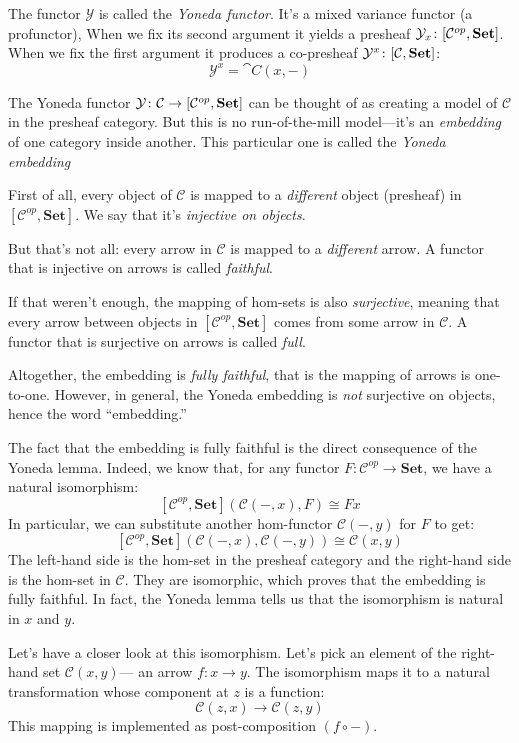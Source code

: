 \documentclass[DaoFP]{subfiles}
\begin{document}
The functor $\mathcal{Y}$ is called the \emph{Yoneda functor}. It's a mixed variance functor (a profunctor), When we fix its second argument it yields a presheaf $\mathcal{Y}_x \colon [\mathcal{C}^{op}, \mathbf{Set}]$. When we fix the first argument it produces a co-presheaf $\mathcal{Y}^x \colon [\mathcal{C}, \mathbf{Set}]$:
\[ \mathcal{Y}^x  = \cat C(x, -) \]


The Yoneda functor $\mathcal{Y} \colon \mathcal{C} \to [\mathcal{C}^{op}, \mathbf{Set}]$ can be thought of as creating a model of $\mathcal{C}$ in the presheaf category. But this is no run-of-the-mill model---it's an \emph{embedding} of one category inside another. This particular one is called the \emph{Yoneda embedding} 

First of all, every object of $\mathcal{C}$ is mapped to a \emph{different} object (presheaf) in $[\mathcal{C}^{op},  \mathbf{Set}]$. We say that it's \emph{injective on objects}. 

But that's not all: every arrow in $\mathcal{C}$ is mapped to a \emph{different} arrow. A functor that is injective on arrows is called \emph{faithful}. 

If that weren't enough, the mapping of hom-sets is also \emph{surjective}, meaning that every arrow between objects in $[\mathcal{C}^{op},  \mathbf{Set}]$ comes from some arrow in $\mathcal{C}$. A functor that is surjective on arrows is called \emph{full}. 

Altogether, the embedding is \emph{fully faithful}, that is the mapping of arrows is one-to-one. However, in general, the Yoneda embedding is \emph{not} surjective on objects, hence the word ``embedding.''

The fact that the embedding is fully faithful is the direct consequence of the Yoneda lemma. Indeed, we know that, for any functor $F \colon \mathcal{C}^{op} \to \mathbf{Set}$, we have a natural isomorphism:
\[ [\mathcal{C}^{op}, \mathbf{Set}]( \mathcal{C}(-, x), F) \cong F x \]
In particular, we can substitute another hom-functor $\mathcal{C}(-, y)$ for $F$ to get:
\[ [\mathcal{C}^{op}, \mathbf{Set}]( \mathcal{C}(-, x), \mathcal{C}(-, y)) \cong \mathcal{C}(x, y)\]
The left-hand side is the hom-set in the presheaf category and the right-hand side is the hom-set in $\mathcal{C}$. They are isomorphic, which proves that the embedding is fully faithful. In fact, the Yoneda lemma tells us that the isomorphism is natural in $x$ and $y$. 

Let's have a closer look at this isomorphism. Let's pick an element of the right-hand set $\mathcal{C}(x, y)$--- an arrow $f \colon x \to y$. The isomorphism maps it to a natural transformation whose component at $z$ is a function:
\[ \mathcal{C}(z, x) \to \mathcal{C}(z, y) \]
This mapping is implemented as post-composition $(f \circ -)$.
\end{document}
